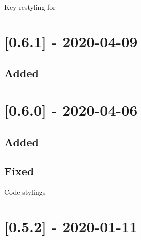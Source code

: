 \begin{shortlist}
    \item Key restyling for 
\end{shortlist}

\section{[0.6.1] - 2020-04-09}

\subsection{Added}

\begin{shortlist}
    \item {}
    \item {}
    \item {}
\end{shortlist}

\section{[0.6.0] - 2020-04-06}

\subsection{Added}

\begin{shortlist}
    \item {}
    \item {}
    \item {}
    \item {}
    \item {}
\end{shortlist}

\subsection{Fixed}

\begin{shortlist}
    \item Code stylings
\end{shortlist}

\section{[0.5.2] - 2020-01-11}

